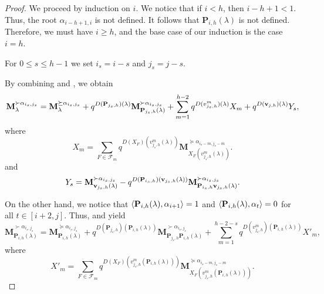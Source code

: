 \begin{proof}
We proceed by induction on $i$. 
We notice that if $i<h$, then $i-h+1<1$.
Thus, the root $\alpha_{i-h+1,i}$ is not defined. 
It follows that $\mathbf{P}_{i,h}(\lambda)$ is not defined.
Therefore, we must have $i\geq h$, and the base case of our induction is the case $i=h$. 


For $0\leq s \leq h-1$ we set $i_s=i-s$ and $j_{s}=j-s$. 
    
By combining  and , we obtain
        \begin{equation}\label{eq:super-lemma-A}
        \mathbf{M}_{\lambda}^{\succ \alpha_{i_s,j_s}} =   \mathbf{M}_{\lambda}^{\succeq \alpha_{i_s,j_s}} +q^{D(\mathbf{P}_{j_s,h})(\lambda)} \mathbf{M}_{ \mathbf{P}_{j_s,h}(\lambda )}^{\succ \alpha_{i_s,j_s}} + \sum_{m=1}^{h-2}  q^{D(v_{j_s,h}^m)(\lambda)}  X_m + q^{D(\mathbf{v}_{j,h})(\lambda)}Y_s,
    \end{equation}
where 
\begin{equation}\label{eq: XXX}
    X_m = \displaystyle\sum_{F\in \mathcal{F}_m} q^{D(X_F)(v_{j_s,h}^m(\lambda))} \mathbf{M}_{X_F(v_{j_s,h}^m(\lambda))}^{\succeq \alpha_{i_s-m,j_s-m}}.
\end{equation}
and 
\begin{equation}\label{eq: YsubS}
    Y_s=  \mathbf{M}_{\mathbf{v}_{j_s,h}(\lambda )}^{\succ \alpha_{i_s,j_s}}-q^{D(\mathbf{P}_{i_s,h})(\mathbf{v}_{j_s,h}(\lambda ))}\mathbf{M}_{\mathbf{P}_{i_s,h}\mathbf{v}_{j_s,h}(\lambda )}^{\succ \alpha_{i_s,j_s}}.  
\end{equation}


On the other hand, we notice that $\langle \mathbf{P}_{i,h}(\lambda) , \alpha_{i+1} \rangle = 1$ and $\langle \mathbf{P}_{i,h}(\lambda) , \alpha_{t} \rangle = 0$ for all $t \in [i+2, j]$. 
Thus,  and  yield
\begin{equation} \label{eq: M de P_i}
     \mathbf{M}_{\mathbf{P}_{i,h}(\lambda)}^{\succ \alpha_{i_s ,j_s}} = \mathbf{M}_{\mathbf{P}_{i,h}(\lambda)}^{\succeq \alpha_{i_s ,j_s}} +  q^{D(\mathbf{P}_{j_s,h})(\mathbf{P}_{i,h}(\lambda))}\mathbf{M}_{\mathbf{P}_{j_s,h}\mathbf{P}_{i,h}(\lambda)}^{\succ \alpha_{i_s ,j_s}} + \sum_{m=1}^{h-2-s}q^{D(v_{j_s,h}^m)(\mathbf{P}_{i,h}(\lambda))}X'_m,
\end{equation}
where 
\begin{equation}\label{eq: XXX prime}
    X'_m =  \sum_{F\in \mathcal{F}_m} q^{D(X_F)(v_{j_s,h}^m(\mathbf{P}_{i,h}(\lambda)))} \mathbf{M}_{X_F(v_{j_s,h}^m(\mathbf{P}_{i,h}(\lambda)))}^{\succeq \alpha_{i_s-m,j_s-m}}.
\end{equation}


\end{proof}
